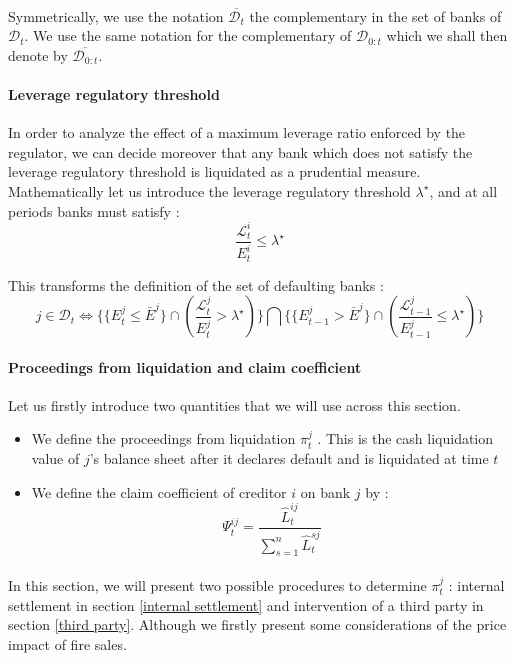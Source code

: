 \documentclass{article}
\newcommand{\wh}{\widehat}
\begin{document}
\paragraph{}
Symmetrically, we use the notation $\overline{\mathcal{D}_{t}}$ the complementary in the set of banks of $\mathcal{D}_{t}$. We use the same notation for the complementary of $\mathcal{D}_{0:t}$ which we shall then denote by $\overline{\mathcal{D}_{0:t}}$.

\paragraph{Leverage regulatory threshold}
In order to analyze the effect of a maximum leverage ratio enforced by the regulator, we can decide moreover that any bank which does not satisfy the leverage regulatory threshold is liquidated as a prudential measure. Mathematically let us introduce the leverage regulatory threshold $\lambda^{\star}$, and at all periods banks must satisfy : 
$$\frac{\mathcal{L}^i_t}{E^i_t} \leq \lambda^{\star} $$

This transforms the definition of the set of defaulting banks : 
$$j \in \mathcal{D}_{t} \Leftrightarrow \bigg\{ \{ E_t^j \leq \bar{E}^j \}\cap \left( \frac{\mathcal{L}^j_t}{E^j_t} > \lambda^{\star} \right) \bigg\}  \bigcap \bigg\{ \{ E_{t-1}^j > \bar{E}^j \}\cap \left( \frac{\mathcal{L}^j_{t-1}}{E^j_{t-1}} \leq \lambda^{\star} \right) \bigg\}$$

\paragraph{Proceedings from liquidation and claim coefficient}
Let us firstly introduce two quantities that we will use across this section. 

\begin{itemize}

\item We define the proceedings from liquidation $\pi_t^j$ . This is the cash liquidation value of $j$'s balance sheet after it declares default and is liquidated at time $t$
\item We define the claim coefficient of creditor $i$ on bank $j$ by :
$$\Psi_t^{ij} = \frac{\wh L_t^{ij}}{\sum_{s=1}^n \wh L_t^{sj}} $$

\end{itemize}

\paragraph{}
In this section, we will present two possible procedures to determine $\pi_t^j$ : internal settlement in section \ref{internal settlement} and intervention of a third party in section \ref{third party}. Although we firstly present some considerations of the price impact of fire sales.
\end{document}
